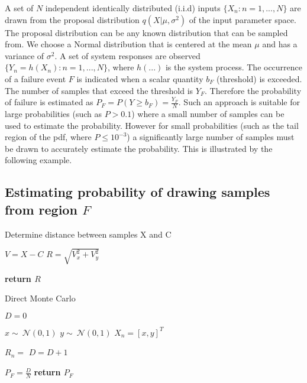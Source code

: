 \documentclass[journal]{IEEEtran}
\begin{document}
A set of $N$ independent identically distributed (i.i.d) inputs $\{X_{n}: n = 1,...,N\}$ are drawn from the proposal distribution $q(X|\mu,\sigma^{2})$ of the input parameter space. The proposal distribution can be any known distribution that can be sampled from. We choose a Normal distribution that is centered at the mean $\mu$ and has a variance of $\sigma^{2}$. A set of system responses are observed $\{Y_{n} = h(X_{n}): n = 1,...,N\}$, where $h(...)$ is the system process. The occurrence of a failure event $F$ is indicated when a scalar quantity $b_{F}$ (threshold) is exceeded. The number of samples that exceed the threshold is $Y_{F}$. Therefore the probability of failure is estimated as $P_{F} = P(Y \geq b_{F}) = \frac{Y_{F}}{N}$. Such an approach is suitable for large probabilities (such as $P > 0.1$) where a small number of samples can be used to estimate the probability. However for small probabilities (such as the tail region of the pdf, where $P \leq 10^{-3}$) a significantly large number of samples must be drawn to accurately estimate the probability. This is illustrated by the following example.

\subsection{Estimating probability of drawing samples from region $F$}
\begin{algorithm}[!t]\caption{Determine distance between samples X and C}
\label{alg:h}
\begin{algorithmic}[1]
        \State $V = X - C$
\State $R = \sqrt{V_{x}^{2} + V_{y}^{2}}$
				
	\State \textbf{return $R$}	
	\EndFunction
\end{algorithmic}
\end{algorithm}

\begin{algorithm}[!t]\caption{Direct Monte Carlo}
\label{alg:dmc}
\begin{algorithmic}[1]
	
\State $D = 0$
	
\State $x \sim{~} \mathcal{N}(0,1)$
        \State $y \sim{~} \mathcal{N}(0,1)$
        \State $X_{n} = [x,y]^{T}$
				
\State $R_{n} = $ 
					\State $D = D + 1$
				\EndIf
      \EndFor
			
\State $P_{F} = \frac{D}{N}$
	\State \textbf{return $P_{F}$}	
	\EndFunction
\end{algorithmic}
\end{algorithm}
\end{document}
